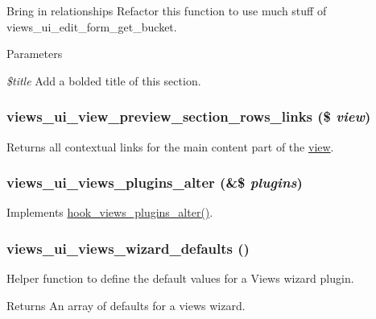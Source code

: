 Bring in relationships Refactor this function to use much stuff of views\_\-ui\_\-edit\_\-form\_\-get\_\-bucket.


\begin{DoxyParams}{Parameters}
\item[{\em \$title}]Add a bolded title of this section. \end{DoxyParams}
\hypertarget{views__ui_8module_acb8a2378590d1fc1bd5ac11accc95d73}{
\subsubsection[{views\_\-ui\_\-view\_\-preview\_\-section\_\-rows\_\-links}]{\setlength{\rightskip}{0pt plus 5cm}views\_\-ui\_\-view\_\-preview\_\-section\_\-rows\_\-links (\$ {\em view})}}
\label{views__ui_8module_acb8a2378590d1fc1bd5ac11accc95d73}
Returns all contextual links for the main content part of the \hyperlink{classview}{view}. \hypertarget{views__ui_8module_a30510f1634492251ad7821713cb8c052}{
\subsubsection[{views\_\-ui\_\-views\_\-plugins\_\-alter}]{\setlength{\rightskip}{0pt plus 5cm}views\_\-ui\_\-views\_\-plugins\_\-alter (\&\$ {\em plugins})}}
\label{views__ui_8module_a30510f1634492251ad7821713cb8c052}
Implements \hyperlink{group__views__hooks_ga6c4e4c2a769b0017bf0edcd0adae57e9}{hook\_\-views\_\-plugins\_\-alter()}. \hypertarget{views__ui_8module_a613f09404d3477163eee3f775c0abcbc}{
\subsubsection[{views\_\-ui\_\-views\_\-wizard\_\-defaults}]{\setlength{\rightskip}{0pt plus 5cm}views\_\-ui\_\-views\_\-wizard\_\-defaults ()}}
\label{views__ui_8module_a613f09404d3477163eee3f775c0abcbc}
Helper function to define the default values for a Views wizard plugin.

\begin{DoxyReturn}{Returns}
An array of defaults for a views wizard. 
\end{DoxyReturn}
